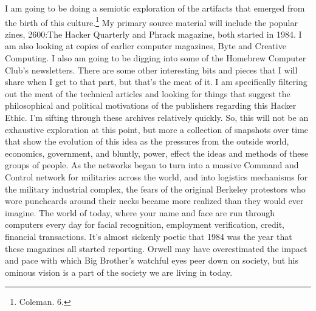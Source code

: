 \documentclass[11pt]{article}
\begin{document}
I am going to be doing a semiotic exploration of the artifacts that emerged from the birth of this culture.\footnote{Coleman. 6.} My primary source material will include the popular zines, 2600:The Hacker Quarterly and Phrack magazine, both started in 1984. I am also looking at copies of earlier computer magazines, Byte and Creative Computing. I also am going to be digging into some of the Homebrew Computer Club's newsletters. There are some other interesting bits and pieces that I will share when I get to that part, but that's the meat of it. I am specifically filtering out the meat of the technical articles and looking for things that suggest the philosophical and political motivations of the publishers regarding this Hacker Ethic. I'm sifting through these archives relatively quickly. So, this will not be an exhaustive exploration at this point, but more a collection of snapshots over time that show the evolution of this idea as the pressures from the outside world, economics, government, and bluntly, power, effect the ideas and methods of these groups of people. As the networks began to turn into a massive Command and Control network for militaries across the world, and into logistics mechanisms for the military industrial complex, the fears of the original Berkeley protestors who wore punchcards around their necks became more realized than they would ever imagine. The world of today, where your name and face are run through computers every day for facial recognition, employment verification, credit, financial transactions. It's almost sickenly poetic that 1984 was the year that these magazines all started reporting. Orwell may have overestimated the impact and pace with which Big Brother's watchful eyes peer down on society, but his ominous vision is a part of the society we are living in today.
\end{document}

